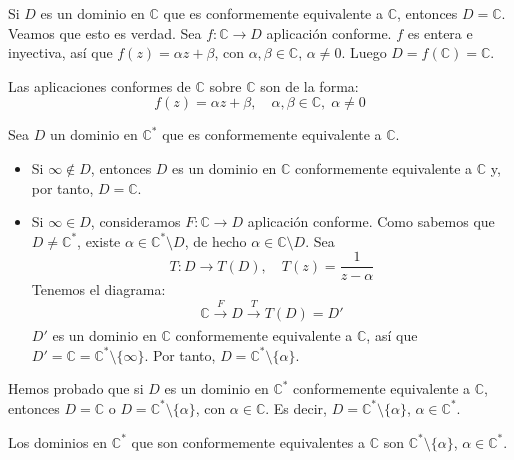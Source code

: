 Si $D$ es un dominio en $\mathbb{C}$ que es conformemente equivalente a $\mathbb{C}$, entonces $D = \mathbb{C}$.
Veamos que esto es verdad.
Sea $f: \mathbb{C} \to D$ aplicación conforme.
$f$ es entera e inyectiva, así que $f(z) = \alpha z + \beta$, con $\alpha, \beta \in \mathbb{C}$, $\alpha \neq 0$.
Luego $D = f(\mathbb{C}) = \mathbb{C}$.

Las aplicaciones conformes de $\mathbb{C}$ sobre $\mathbb{C}$ son de la forma:
$$f(z) = \alpha z + \beta, \quad \alpha, \beta \in \mathbb{C}, \; \alpha \neq 0$$

Sea $D$ un dominio en $\mathbb{C}^\ast$ que es conformemente equivalente a $\mathbb{C}$.
\begin{itemize}
    \item Si $\infty \notin D$, entonces $D$ es un dominio en $\mathbb{C}$ conformemente equivalente a $\mathbb{C}$ y, por tanto, $D = \mathbb{C}$.
    \item Si $\infty \in D$, consideramos $F: \mathbb{C} \to D$ aplicación conforme.
          Como sabemos que $D \neq \mathbb{C}^\ast$, existe $\alpha \in \mathbb{C}^\ast \setminus D$, de hecho $\alpha \in \mathbb{C} \setminus D$.
          Sea
          $$T: D \to T(D), \quad T(z) = \frac{1}{z-\alpha}$$
          Tenemos el diagrama:
          $$\mathbb{C} \xrightarrow[]{F} D \xrightarrow[]{T} T(D) = D'$$
          $D'$ es un dominio en $\mathbb{C}$ conformemente equivalente a $\mathbb{C}$, así que $D' = \mathbb{C} = \mathbb{C}^\ast \setminus \{\infty\}$.
          Por tanto, $D = \mathbb{C}^\ast \setminus \{\alpha\}$.
\end{itemize}

Hemos probado que si $D$ es un dominio en $\mathbb{C}^\ast$ conformemente equivalente a $\mathbb{C}$, entonces $D = \mathbb{C}$ o $D = \mathbb{C}^\ast \setminus \{\alpha\}$, con $\alpha \in \mathbb{C}$.
Es decir, $D = \mathbb{C}^\ast \setminus \{\alpha\}$, $\alpha \in \mathbb{C}^\ast$.

Los dominios en $\mathbb{C}^\ast$ que son conformemente equivalentes a $\mathbb{C}$ son $\mathbb{C}^\ast \setminus \{\alpha\}$, $\alpha \in \mathbb{C}^\ast$.

